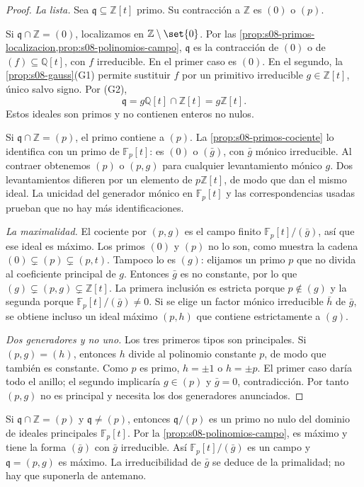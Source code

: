 \begin{proof}
\emph{La lista.} Sea $\mathfrak q\subseteq\mathbb Z[t]$ primo. Su contracción a $\mathbb Z$ es $(0)$ o $(p)$.

Si $\mathfrak q\cap\mathbb Z=(0)$, localizamos en $\mathbb Z\setminus\set{0}$. Por las \cref{prop:s08-primos-localizacion,prop:s08-polinomios-campo}, $\mathfrak q$ es la contracción de $(0)$ o de $(f)\subseteq\mathbb Q[t]$, con $f$ irreducible. En el primer caso es $(0)$. En el segundo, la \cref{prop:s08-gauss}(G1) permite sustituir $f$ por un primitivo irreducible $g\in\mathbb Z[t]$, único salvo signo. Por (G2),
\[
\mathfrak q=g\mathbb Q[t]\cap\mathbb Z[t]=g\mathbb Z[t].
\]
Estos ideales son primos y no contienen enteros no nulos.

Si $\mathfrak q\cap\mathbb Z=(p)$, el primo contiene a $(p)$. La \cref{prop:s08-primos-cociente} lo identifica con un primo de $\mathbb F_p[t]$: es $(0)$ o $(\bar g)$, con $\bar g$ mónico irreducible. Al contraer obtenemos $(p)$ o $(p,g)$ para cualquier levantamiento mónico $g$. Dos levantamientos difieren por un elemento de $p\mathbb Z[t]$, de modo que dan el mismo ideal. La unicidad del generador mónico en $\mathbb F_p[t]$ y las correspondencias usadas prueban que no hay más identificaciones.

\emph{La maximalidad.} El cociente por $(p,g)$ es el campo finito $\mathbb F_p[t]/(\bar g)$, así que ese ideal es máximo. Los primos $(0)$ y $(p)$ no lo son, como muestra la cadena $(0)\subsetneq(p)\subsetneq(p,t)$. Tampoco lo es $(g)$: elijamos un primo $p$ que no divida al coeficiente principal de $g$. Entonces $\bar g$ es no constante, por lo que $(g)\subsetneq(p,g)\subsetneq\mathbb Z[t]$. La primera inclusión es estricta porque $p\notin(g)$ y la segunda porque $\mathbb F_p[t]/(\bar g)\ne0$. Si se elige un factor mónico irreducible $\bar h$ de $\bar g$, se obtiene incluso un ideal máximo $(p,h)$ que contiene estrictamente a $(g)$.

\emph{Dos generadores y no uno.} Los tres primeros tipos son principales. Si $(p,g)=(h)$, entonces $h$ divide al polinomio constante $p$, de modo que también es constante. Como $p$ es primo, $h=\pm1$ o $h=\pm p$. El primer caso daría todo el anillo; el segundo implicaría $g\in(p)$ y $\bar g=0$, contradicción. Por tanto $(p,g)$ no es principal y necesita los dos generadores anunciados.
\end{proof}

\begin{obs}
\label{obs:s08-paso-maximalidad}
Si $\mathfrak q\cap\mathbb Z=(p)$ y $\mathfrak q\ne(p)$, entonces $\mathfrak q/(p)$ es un primo no nulo del dominio de ideales principales $\mathbb F_p[t]$. Por la \cref{prop:s08-polinomios-campo}, es máximo y tiene la forma $(\bar g)$ con $\bar g$ irreducible. Así $\mathbb F_p[t]/(\bar g)$ es un campo y $\mathfrak q=(p,g)$ es máximo. La irreducibilidad de $\bar g$ se deduce de la primalidad; no hay que suponerla de antemano.
\end{obs}

